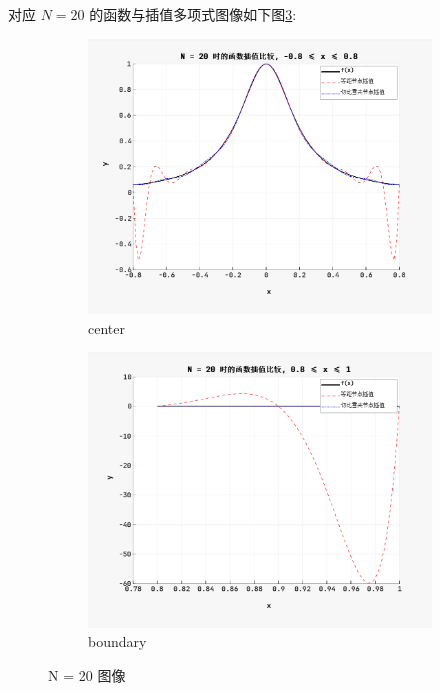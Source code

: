 \documentclass[12pt]{article}
\begin{document}
		对应 $N = 20$ 的函数与插值多项式图像如下图\ref{fig:20}:
		\begin{figure}[htbp]
			\centering
			\begin{subfigure}{0.45\textwidth}
				\centering
				\includegraphics[width=\textwidth]{fig/center.png}
				\caption{center}
				\label{fig:center}
			\end{subfigure}
			\begin{subfigure}{0.45\textwidth}
				\centering
				\includegraphics[width=\textwidth]{fig/boundary.png}
				\caption{boundary}
				\label{fig:boundary}
			\end{subfigure}
			\caption{N = 20 图像}
			\label{fig:20}
		\end{figure}
\end{document}
